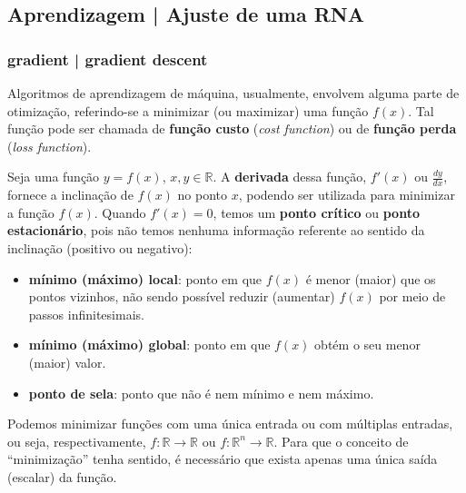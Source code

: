 \documentclass{automatextcc}
\newcommand{\R}{\mathds{R}}
\begin{document}


\subsection{Aprendizagem | Ajuste de uma RNA}


\subsubsection{gradient | gradient descent}
Algoritmos de aprendizagem de máquina, usualmente, envolvem alguma parte de otimização, referindo-se a minimizar (ou maximizar) uma função $f(x)$. Tal função pode ser chamada de \textbf{função custo} (\textit{cost function}) ou de \textbf{função perda} (\textit{loss function}). 

Seja uma função $y=f(x)$, $x,y \in \R$. A \textbf{derivada} dessa função, $f'(x)$ ou $\frac{dy}{dx}$, fornece a inclinação de $f(x)$ no ponto $x$, podendo ser utilizada para minimizar a função $f(x)$. Quando $f'(x)=0$, temos um \textbf{ponto crítico} ou \textbf{ponto estacionário}, pois não temos nenhuma informação referente ao sentido da inclinação (positivo ou negativo):
\begin{itemize} %
    \item \textbf{mínimo (máximo) local}: ponto em que $f(x)$ é menor (maior) que os pontos vizinhos, não sendo possível reduzir (aumentar) $f(x)$ por meio de passos infinitesimais.
    \item \textbf{mínimo (máximo) global}: ponto em que $f(x)$ obtém o seu menor (maior) valor.
    \item \textbf{ponto de sela}: ponto que não é nem mínimo e nem máximo.
\end{itemize}
Podemos minimizar funções com uma única entrada ou com múltiplas entradas, ou seja, respectivamente, $f: \R \rightarrow \R$ ou $f: \R^n \rightarrow \R$. Para que o conceito de ``minimização'' tenha sentido, é necessário que exista apenas uma única saída (escalar) da função.
\end{document}
